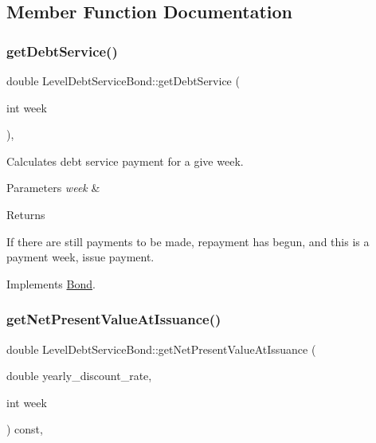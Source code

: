\subsection{Member Function Documentation}
\mbox{\label{classLevelDebtServiceBond_adcb3bd3c34b0cbb7b013f387ddd8b7f5}} 
\subsubsection{\texorpdfstring{get\+Debt\+Service()}{getDebtService()}}
{\footnotesize\ttfamily double Level\+Debt\+Service\+Bond\+::get\+Debt\+Service (\begin{DoxyParamCaption}\item[{int}]{week }\end{DoxyParamCaption})\hspace{0.3cm}{\ttfamily [override]}, {\ttfamily [virtual]}}

Calculates debt service payment for a give week. 
\begin{DoxyParams}{Parameters}
{\em week} & \\
\hline
\end{DoxyParams}
\begin{DoxyReturn}{Returns}

\end{DoxyReturn}
If there are still payments to be made, repayment has begun, and this is a payment week, issue payment. 

Implements \mbox{\hyperlink{classBond_a98d8ecaf4b36319674ebd220598996bc}{Bond}}.

\mbox{\label{classLevelDebtServiceBond_a0f5820c3e76b8b908dbe153a8291d96a}} 
\subsubsection{\texorpdfstring{get\+Net\+Present\+Value\+At\+Issuance()}{getNetPresentValueAtIssuance()}}
{\footnotesize\ttfamily double Level\+Debt\+Service\+Bond\+::get\+Net\+Present\+Value\+At\+Issuance (\begin{DoxyParamCaption}\item[{double}]{yearly\+\_\+discount\+\_\+rate,  }\item[{int}]{week }\end{DoxyParamCaption}) const\hspace{0.3cm}{\ttfamily [override]}, {\ttfamily [virtual]}}



